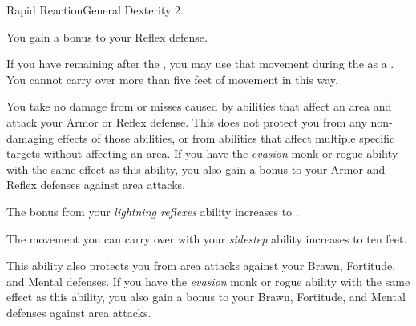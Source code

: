   \begin{feat}{Rapid Reaction}{General}
    \featpre Dexterity 2.

     You gain a  bonus to your Reflex defense.

     If you have  remaining after the , you may use that movement during the  as a .
    You cannot carry over more than five feet of movement in this way.

     You take no damage from  or misses caused by abilities that affect an area and attack your Armor or Reflex defense.
    This does not protect you from any non-damaging effects of those abilities, or from abilities that affect multiple specific targets without affecting an area.
    If you have the \textit{evasion} monk or rogue ability with the same effect as this ability, you also gain a  bonus to your Armor and Reflex defenses against area attacks.

     The bonus from your \textit{lightning reflexes} ability increases to .

     The movement you can carry over with your \textit{sidestep} ability increases to ten feet.

     This ability also protects you from area attacks against your Brawn, Fortitude, and Mental defenses.
    If you have the \textit{evasion\plus} monk or rogue ability with the same effect as this ability, you also gain a  bonus to your Brawn, Fortitude, and Mental defenses against area attacks.
  \end{feat}

